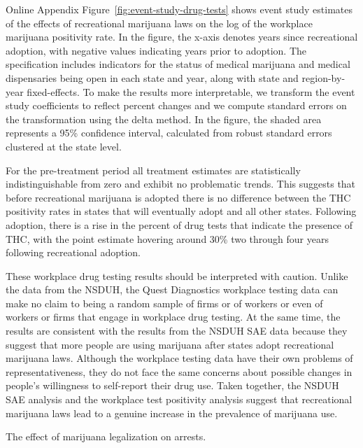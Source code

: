 \documentclass[12pt]{article}%
\begin{document}
Online Appendix Figure~\ref{fig:event-study-drug-tests} shows event study estimates of the effects of recreational marijuana laws on the log of the workplace marijuana positivity rate. 
In the figure, the x-axis denotes years since recreational adoption, with negative values indicating years prior to adoption. 
The specification includes indicators for the status of medical marijuana and medical dispensaries being open in each state and year, along with state and region-by-year fixed-effects.
To make the results more interpretable, we transform the event study coefficients to reflect percent changes and we compute standard errors on the transformation using the delta method. In the figure, the shaded area represents a 95\% confidence interval, calculated from robust standard errors clustered at the state level.

For the pre-treatment period all treatment estimates are statistically indistinguishable from zero and exhibit no problematic trends. 
This suggests that before recreational marijuana is adopted there is no difference between the THC positivity rates in states that will eventually adopt and all other states. 
Following adoption, there is a rise in the percent of drug tests that indicate the presence of THC, with the point estimate hovering around 30\% two through four years following recreational adoption. 

These workplace drug testing results should be interpreted with caution. 
Unlike the data from the NSDUH, the Quest Diagnostics workplace testing data can make no claim to being a random sample of firms or of workers or even of workers or firms that engage in workplace drug testing. 
At the same time, the results are consistent with the results from the NSDUH SAE data because they suggest that more people are using marijuana after states adopt recreational marijuana laws. 
Although the workplace testing data have their own problems of representativeness, they do not face the same concerns about possible changes in people's willingness to self-report their drug use. 
Taken together, the NSDUH SAE analysis and the workplace test positivity analysis suggest that recreational marijuana laws lead to a genuine increase in the prevalence of marijuana use.


\begin{table}[ht]\centering
    \begin{adjustbox}{width=.7\textwidth}
    \centering
      \begin{threeparttable}
        \caption{The effect of marijuana legalization on arrests.}
      \label{tab:arrest_poisson}
      \end{threeparttable}
     \end{adjustbox}
\end{table}
\end{document}
